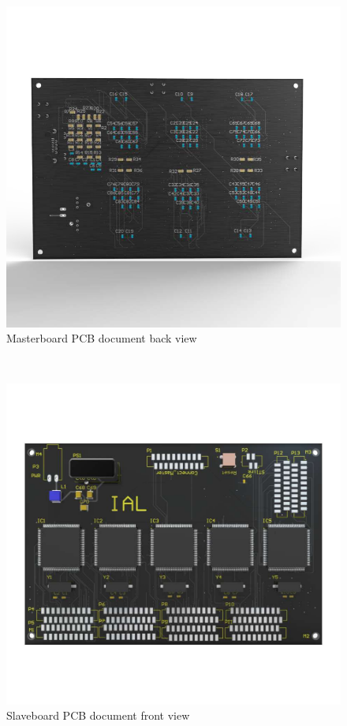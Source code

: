 \begin{figure}[!ht]
	\centering
	\includegraphics[width=16cm]{grafiken/6.15.pdf}
	\caption{Masterboard PCB document back view} 
	\label{fig:6.15}
\end{figure}
\FloatBarrier
\\


\begin{figure}[!ht]
	\centering
	\includegraphics[width=16cm]{grafiken/6.16.pdf}
	\caption{Slaveboard PCB document front view} 
	\label{fig:6.16}
\end{figure}
\FloatBarrier
\\


